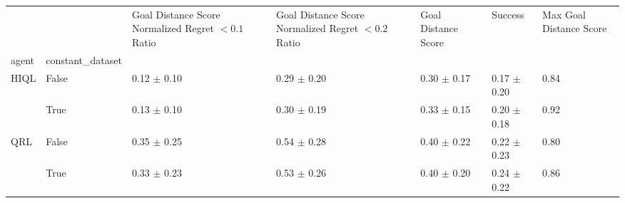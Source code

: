 \begin{tabular}{lllllll}
\toprule
 &  & Goal Distance Score Normalized Regret $< 0.1$ Ratio & Goal Distance Score Normalized Regret $< 0.2$ Ratio & Goal Distance Score & Success & Max Goal Distance Score \\
agent & constant_dataset &  &  &  &  &  \\
\midrule
\multirow[t]{2}{*}{HIQL} & False & 0.12 $\pm$ 0.10 & 0.29 $\pm$ 0.20 & 0.30 $\pm$ 0.17 & 0.17 $\pm$ 0.20 & 0.84 \\
 & True & 0.13 $\pm$ 0.10 & 0.30 $\pm$ 0.19 & 0.33 $\pm$ 0.15 & 0.20 $\pm$ 0.18 & 0.92 \\
\cline{1-7}
\multirow[t]{2}{*}{QRL} & False & 0.35 $\pm$ 0.25 & 0.54 $\pm$ 0.28 & 0.40 $\pm$ 0.22 & 0.22 $\pm$ 0.23 & 0.80 \\
 & True & 0.33 $\pm$ 0.23 & 0.53 $\pm$ 0.26 & 0.40 $\pm$ 0.20 & 0.24 $\pm$ 0.22 & 0.86 \\
\cline{1-7}
\bottomrule
\end{tabular}

